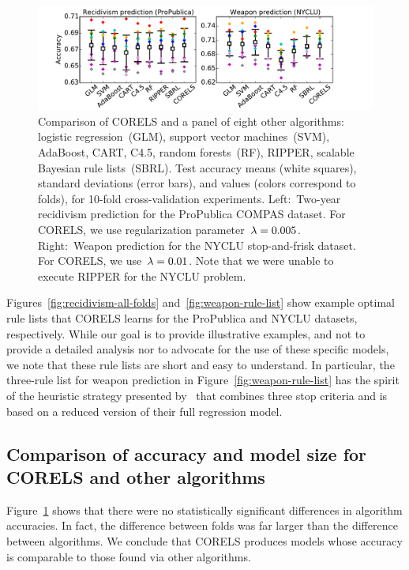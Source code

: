 \begin{figure}[t!]
\begin{center}
\includegraphics[trim={14mm, 5mm, 30mm, 5mm},
width=\textwidth]{figs/compare-compas-weapon.pdf}
\end{center}
\caption{Comparison of CORELS and a panel of eight other algorithms:
logistic regression~(GLM), support vector machines~(SVM),
AdaBoost, CART, C4.5, random forests~(RF), RIPPER,
scalable Bayesian rule lists~(SBRL).
%
Test accuracy means (white squares),
standard deviations (error bars),
and values (colors correspond to folds),
for 10-fold cross-validation experiments.
%
Left:~Two-year recidivism prediction for the ProPublica COMPAS dataset.
%
For CORELS, we use regularization parameter~${{\lambda}=0.005}$.
%
Right:~Weapon prediction for the NYCLU stop-and-frisk dataset.
%
For CORELS, we use~${{\lambda}=0.01}$.
%
Note that we were unable to execute RIPPER for the NYCLU problem.
}
\label{fig:comparison}
\end{figure}

Figures~\ref{fig:recidivism-all-folds} and~\ref{fig:weapon-rule-list}
show example optimal rule lists that CORELS learns
for the ProPublica and NYCLU datasets, respectively.
%
While our goal is to provide illustrative examples, and not to provide a
detailed analysis nor to advocate for the use of these specific models,
we note that these rule lists are short and easy to understand.
%
In particular, the three-rule list for weapon prediction
in Figure~\ref{fig:weapon-rule-list} has the spirit of the heuristic
strategy presented by~\citet{Goel16} that combines three stop criteria
and is based on a reduced version of their full regression model.

\subsection{Comparison of accuracy and model size for CORELS and other algorithms}
\label{sec:sparsity}

Figure~\ref{fig:comparison} shows that there were no statistically significant
differences in algorithm accuracies.
In fact, the difference between folds was far larger than the difference
between algorithms.
We conclude that CORELS produces models whose accuracy is comparable
to those found via other algorithms.

